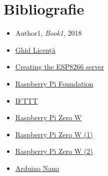 \chapter*{Bibliografie} 

\begin{itemize}
    \item Author1, \textit{Book1}, 2018
    \item \href{https://profs.info.uaic.ro/~licenta/2019Feb/res/Ghid-LICENTA-2018.pdf}{Ghid Licență}
	\item \href{https://tttapa.github.io/ESP8266/Chap10%20-%20Simple%20Web%20Server.html}{Creating the ESP8266 server}
	\item \href{https://www.raspberrypi.org/}{Raspberry Pi Foundation}
	\item \href{https://www.pcmag.com/reviews/ifttt}{IFTTT}
	\item \href{https://www.pcmag.com/reviews/raspberry-pi-zero-w}{Raspberry Pi Zero W}
	\item \href{https://www.trustedreviews.com/reviews/1-raspberry-pi-zero-w}{Raspberry Pi Zero W (1)}
	\item \href{https://itsfoss.com/raspberry-pi-zero-w/}{Raspberry Pi Zero W (2)}
	\item \href{https://www.makeuseof.com/tag/cheapest-arduino-nano/}{Arduino Nano}
	
\end{itemize}